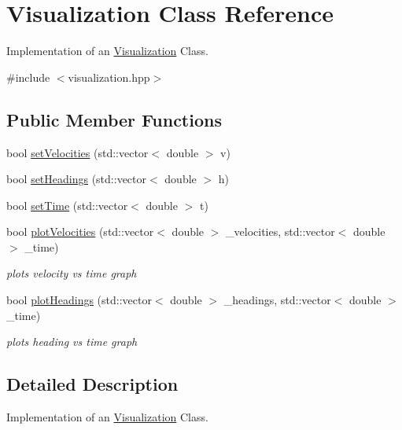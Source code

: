 \hypertarget{classVisualization}{}\section{Visualization Class Reference}
\label{classVisualization}


Implementation of an \hyperlink{classVisualization}{Visualization} Class.  




{\ttfamily \#include $<$visualization.\+hpp$>$}

\subsection*{Public Member Functions}
\begin{DoxyCompactItemize}
\item 
bool \hyperlink{classVisualization_a5a77f1a16a69153aa4671e8c56e1cbc9}{set\+Velocities} (std\+::vector$<$ double $>$ v)
\item 
bool \hyperlink{classVisualization_a012238010c15a864fe592de3c8a6a7fa}{set\+Headings} (std\+::vector$<$ double $>$ h)
\item 
bool \hyperlink{classVisualization_a39cc1a94ab49ffc11a1542ef9646858a}{set\+Time} (std\+::vector$<$ double $>$ t)
\item 
bool \hyperlink{classVisualization_a91068dbd17952cf42439b377f1a2b1ca}{plot\+Velocities} (std\+::vector$<$ double $>$ \+\_\+velocities, std\+::vector$<$ double $>$ \+\_\+time)
\begin{DoxyCompactList}\small\item\em plots velocity vs time graph \end{DoxyCompactList}\item 
bool \hyperlink{classVisualization_a6896d287f4575a5ccc5a4370e36dbb19}{plot\+Headings} (std\+::vector$<$ double $>$ \+\_\+headings, std\+::vector$<$ double $>$ \+\_\+time)
\begin{DoxyCompactList}\small\item\em plots heading vs time graph \end{DoxyCompactList}\end{DoxyCompactItemize}


\subsection{Detailed Description}
Implementation of an \hyperlink{classVisualization}{Visualization} Class. 

